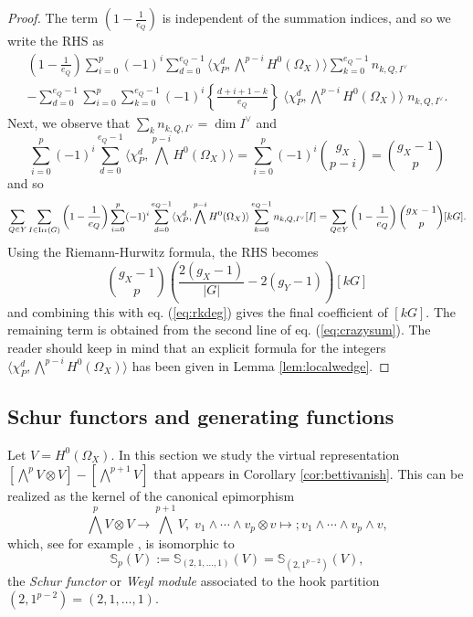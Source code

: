 \documentclass[10pt]{amsart}
\theoremstyle{definition}
\begin{document}
\begin{proof}
The term $(1-\frac{1}{e_Q})$ is independent of the summation indices, and so we write the RHS as
\begin{multline}\label{eq:crazysum}
\left(1-\frac{1}{e_Q}\right)
\sum_{i=0}^{p}
(-1)^i
\sum_{d=0}^{e_Q-1}
\langle
\chi_P^{d},
\bigwedge^{p-i}H^0(\Omega_X)
\rangle
\sum_{k=0}^{e_Q-1}
n_{k,Q,I^\vee}
\\
-
\sum_{d=0}^{e_Q-1}\sum_{i=0}^{p}\sum_{k=0}^{e_Q-1}
(-1)^i
\left\{
\frac{d+i+1-k}{e_Q}
\right\}
\;
\langle
\chi_P^{d},
\bigwedge^{p-i}H^0(\Omega_X)
\rangle
\;
n_{k,Q,I^\vee}.
\end{multline}
Next, we observe that $\sum_k n_{k,Q,I^\vee}=\dim I^\vee$ and
\[
\sum_{i=0}^{p}
(-1)^i
\sum_{d=0}^{e_Q-1}
\langle
\chi_P^{d},
\bigwedge^{p-i}H^0(\Omega_X)
\rangle
=
\sum_{i=0}^{p}
(-1)^i \binom{g_X}{p-i}
=
\binom{g_X-1}{p}
\]
and so
\[
\sum_{Q\in Y}\sum_{I\in{\rm Irr}(G)} \left(1-\frac{1}{e_Q}\right)
\sum_{i=0}^{p}
(-1)^i
\sum_{d=0}^{e_Q-1}
\langle
\chi_P^{d},
\bigwedge^{p-i}H^0(\Omega_X)
\rangle
\sum_{k=0}^{e_Q-1}
n_{k,Q,I^\vee}
[I]
=
\sum_{Q\in Y}\left(1-\frac{1}{e_Q}\right)
\binom{g_X-1}{p}
[kG].
\]
Using the Riemann-Hurwitz formula, the RHS becomes
\[
\binom{g_X-1}{p}\left(\frac{2(g_X-1)}{|G|}-2(g_Y-1)\right)[kG]
\]
and combining this with eq. (\ref{eq:rkdeg}) gives the final coefficient of $[kG]$. The remaining term is obtained from the second line of eq. (\ref{eq:crazysum}). The reader should keep in mind that an explicit formula for the integers $\langle
\chi_P^{d},
\bigwedge^{p-i}H^0(\Omega_X)
\rangle$ has been given in Lemma \ref{lem:localwedge}.
\end{proof}



\subsection{Schur functors and generating functions}
Let $V=H^0(\Omega_X)$. In this section we study the virtual representation $[\bigwedge^{p}V\otimes V]-[\bigwedge^{p+1}V]$ that appears in Corollary \ref{cor:bettivanish}. This can be realized as the kernel of the canonical epimorphism
\[
\bigwedge^{p}V\otimes V\rightarrow \bigwedge^{p+1}V,\; v_1\wedge\cdots \wedge v_p\otimes v\mapsto ;v_1\wedge\cdots \wedge v_p\wedge v,
\]
which, see for example \cite[p.79]{MR1153249}, is isomorphic to 
\[
\mathbb{S}_p(V):=\mathbb{S}_{(2,1,\ldots,1)}(V)=\mathbb{S}_{(2,1^{p-2})}(V),
\] 
the {\em Schur functor} or {\em Weyl module} associated to the hook partition $(2,1^{p-2})=(2,1,\ldots,1)$.\\
\end{document}
